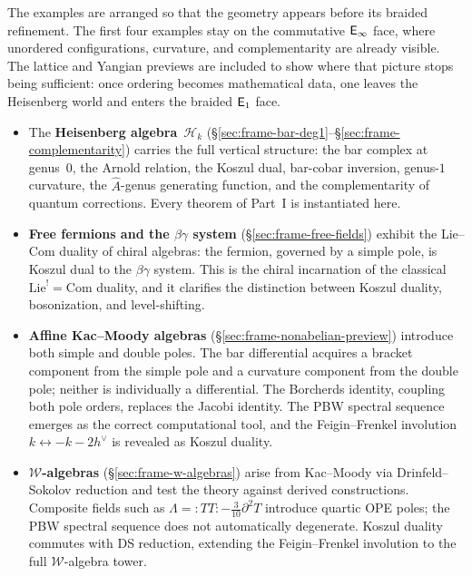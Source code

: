 The examples are arranged so that the geometry appears before its
braided refinement.  The first four examples stay on the commutative
$\mathsf{E}_{\infty}$ face, where unordered configurations, curvature, and
complementarity are already visible.  The lattice and Yangian previews
are included to show where that picture stops being sufficient: once
ordering becomes mathematical data, one leaves the Heisenberg world and
enters the braided $\mathsf{E}_1$ face.

\begin{itemize}
\item The \textbf{Heisenberg algebra}~$\mathcal{H}_k$
  (\S\ref{sec:frame-bar-deg1}--\S\ref{sec:frame-complementarity})
  carries the full vertical structure: the bar complex at genus~$0$,
  the Arnold relation, the Koszul dual, bar-cobar inversion, genus-$1$
  curvature, the $\hat{A}$-genus generating function, and the
  complementarity of quantum corrections.  Every theorem of Part~I is
  instantiated here.

\item \textbf{Free fermions and the $\beta\gamma$ system}
  (\S\ref{sec:frame-free-fields}) exhibit the Lie--Com duality of
  chiral algebras: the fermion, governed by a simple pole, is Koszul
  dual to the $\beta\gamma$ system.  This is the chiral incarnation
  of the classical $\mathrm{Lie}^! = \mathrm{Com}$ duality, and it
  clarifies the distinction between Koszul duality, bosonization, and
  level-shifting.

\item \textbf{Affine Kac--Moody algebras}
  (\S\ref{sec:frame-nonabelian-preview}) introduce both simple and
  double poles.  The bar differential acquires a bracket component
  from the simple pole and a curvature component from the double pole;
  neither is individually a differential.  The Borcherds identity,
  coupling both pole orders, replaces the Jacobi identity.  The PBW
  spectral sequence emerges as the correct computational tool, and
  the Feigin--Frenkel involution
  $k \leftrightarrow -k - 2h^\vee$ is revealed as Koszul duality.

\item \textbf{$\mathcal{W}$-algebras}
  (\S\ref{sec:frame-w-algebras}) arise from Kac--Moody via
  Drinfeld--Sokolov reduction and test the theory against derived
  constructions.  Composite fields such as
  $\Lambda = :\!TT\!: - \tfrac{3}{10}\partial^2 T$ introduce
  quartic OPE poles; the PBW spectral sequence does not automatically
  degenerate.  Koszul duality commutes with DS reduction, extending
  the Feigin--Frenkel involution to the full $\mathcal{W}$-algebra
  tower.


\end{itemize}

